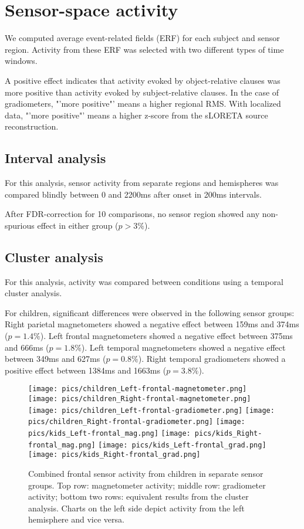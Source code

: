 \section{Sensor-space activity}

We computed average event-related fields (ERF) for each subject and sensor region.
Activity from these ERF was selected with two different types of time windows.

A positive effect indicates that activity evoked by object-relative clauses was more positive than activity evoked by subject-relative clauses. In the case of gradiometers, "'more positive"' means a higher regional RMS. With localized data, "'more positive"' means a higher z-score from the sLORETA source reconstruction.


\subsection{Interval analysis}
For this analysis, sensor activity from separate regions and hemispheres was compared blindly between 0 and 2200ms after onset in 200ms intervals.

After FDR-correction for 10 comparisons, no sensor region showed any non-spurious effect in either group ($p > 3\%$).

\subsection{Cluster analysis}
For this analysis, activity was compared between conditions using a temporal cluster analysis.

For children, significant differences were observed in the following sensor groups:
Right parietal magnetometers showed a negative effect between 159ms and 374ms ($p = 1.4\%$).
Left frontal magnetometers showed a negative effect between 375ms and 666ms ($p = 1.8\%$).
Left temporal magnetometers showed a negative effect between 349ms and 627ms ($p = 0.8\%$).
Right temporal gradiometers showed a positive effect between 1384ms and 1663ms ($p = 3.8\%$).

\begin{figure}[h]
\begin{center}
\texttt{[image: pics/children\_Left-frontal-magnetometer.png]}
\texttt{[image: pics/children\_Right-frontal-magnetometer.png]}
\texttt{[image: pics/children\_Left-frontal-gradiometer.png]}
\texttt{[image: pics/children\_Right-frontal-gradiometer.png]}
\texttt{[image: pics/kids\_Left-frontal\_mag.png]}
\texttt{[image: pics/kids\_Right-frontal\_mag.png]}
\texttt{[image: pics/kids\_Left-frontal\_grad.png]}
\texttt{[image: pics/kids\_Right-frontal\_grad.png]}
\caption{\label{4.2.activity.kids.frontal} Combined frontal sensor activity from children in separate sensor groups. Top row: magnetometer activity; middle row: gradiometer activity; bottom two rows: equivalent results from the cluster analysis. Charts on the left side depict activity from the left hemisphere and vice versa.}
\end{center}
\end{figure}


